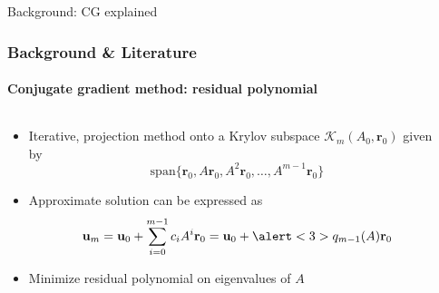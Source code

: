\footerinfootnotesfalse
\begin{frame}[label=background,fragile]{Background: CG explained}
    \frametitle{Background \& Literature}
    \framesubtitle{Conjugate gradient method: residual polynomial}
    \begin{columns}[T,onlytextwidth]
        \begin{column}{.5\textwidth}
            \begin{itemize}
                \item<+-> Iterative, projection method onto a Krylov subspace $\mathcal{K}_m(A_0, \mathbf{r}_0)$ given by
                \begin{equation*}
                     \text{span}\{\mathbf{r}_0, A\mathbf{r}_0, A^2\mathbf{r}_0, \dots, A^{m-1}\mathbf{r}_0\}
                \end{equation*}
                \item<+-> Approximate solution can be expressed as
                \begin{equation*}
                    \mathbf{u}_m = \mathbf{u}_0 + \sum_{i=0}^{m-1} c_i A^i \mathbf{r}_0 = \mathbf{u}_0 + \alert<3>{q_{m-1}}(A)\mathbf{r}_0
                \end{equation*}
                \item<4> Minimize residual polynomial on eigenvalues of $A$
            \end{itemize}
        \end{column}
        \begin{column}{.5\textwidth}
        \end{column}
    \end{columns}
\end{frame}

